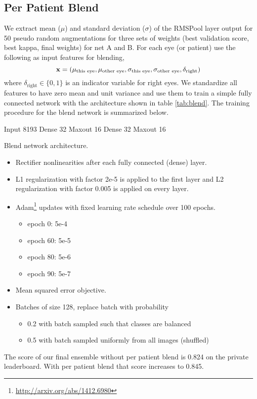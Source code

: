 \documentclass[12pt,a4paper]{scrartcl}
\begin{document}
\subsection{Per Patient Blend}
We extract mean ($\mu$) and standard deviation ($\sigma$) of the RMSPool layer output for 50 pseudo random augmentations for three sets of weights (best validation score, best kappa, final weights) for net A and B. For each eye (or patient) use the following as input features for
blending,
\[
{\bf x} = (\mu_\textrm{this eye}, \mu_\textrm{other eye}, \sigma_\textrm{this eye}, \sigma_\textrm{other eye}, \delta_\textrm{right})
\]
where $\delta_\textrm{right} \in \{0, 1\}$ is an indicator variable for right eyes. We standardize all features to have zero mean and unit variance and use them to train a simple fully connected network with the architecture shown in table \ref{tab:blend}. The training procedure for the blend network is summarized below.
\begin{verbbox}
Input        8193
Dense          32
Maxout         16
Dense          32
Maxout         16
\end{verbbox}
\begin{table}[ht]
\centering
\theverbbox
\caption{Blend network architecture.}
\label{tab:blend}
\end{table}
%
\begin{itemize}
\item Rectifier nonlinearities after each fully connected (dense) layer.
\item L1 regularization with factor 2e-5 is applied to the first layer and L2 regularization with factor 0.005 is applied on every layer.
\item Adam\footnote{\url{http://arxiv.org/abs/1412.6980}} updates with fixed learning rate schedule over 100 epochs.
\begin{itemize}
\item epoch 0: 5e-4
\item epoch 60: 5e-5
\item epoch 80: 5e-6
\item epoch 90: 5e-7
\end{itemize}
\item Mean squared error objective.
\item Batches of size 128, replace batch with probability
\begin{itemize}
\item 0.2 with batch sampled such that classes are balanced
\item 0.5 with batch sampled uniformly from all images (shuffled)
\end{itemize}
\end{itemize}
The score of our final ensemble without per patient blend is 0.824 on the private leaderboard. With per patient blend that score increases to 0.845.
%
\end{document}
